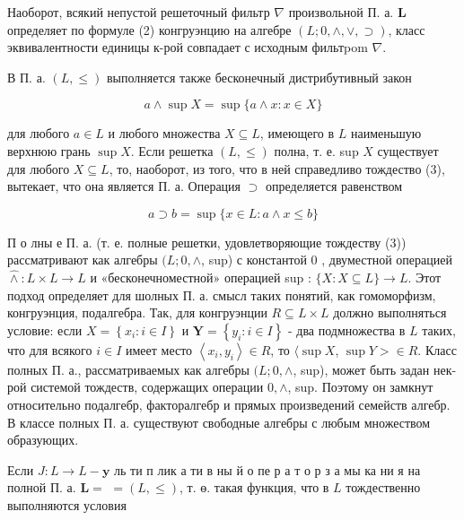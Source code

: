 \documentclass[10pt]{article}
\begin{document}
Наоборот, всякий непустой решеточный фильтр $\nabla$ произвольной П. а. $\boldsymbol{L}$ определяет по формуле (2) конгруэнцию на алгебре $(L ; 0, \wedge, \vee, \supset)$, класс эквивалентности единицы к-рой совпадает с исходным фильтpom $\nabla$.



В П. а. $(L, \leqslant)$ выполняется также бесконечный дистрибутивный закон



\[

a \wedge \sup X=\sup \{a \wedge x: x \in X\}

\]



для любого $a \in L$ и любого множества $X \subseteq L$, имеющего в $L$ наименьшую верхнюю грань $\sup X$. Если решетка $(L, \leqslant)$ полна, т. е. sup $X$ существует для любого $X \subseteq L$, то, наоборот, из того, что в ней справедливо тождество (3), вытекает, что она является П. а. Операция $\supset$ определяется равенством



\[

a \supset b=\sup \{x \in L: a \wedge x \leqslant b\}

\]



П о лны е П. а. (т. е. полные решетки, удовлетворяющие тождеству (3)) рассматривают как алгебры $(L ; 0, \wedge$, sup) с константой 0 , двуместной операцией $\widehat{\wedge}: L \times L \rightarrow L$ и «бесконечноместной» операцией sup : $\{X: X \subseteq L\} \rightarrow L$. Этот подход определяет для шолных П. а. смысл таких понятий, как гомоморфизм, конгруэнция, подалгебра. Так, для конгруэнции $R \subseteq L \times L$ должно выполняться условие: если $X=\left\{x_{i}: i \in I\right\}$ и $\boldsymbol{Y}=\left\{y_{i}: i \in I\right\}$ - два подмножества в $L$ таких, что для всякого $i \in I$ имеет место $\left\langle x_{i}, y_{i}\right\rangle \in R$, то $\langle\sup X$, $\sup Y>\in R$. Класс полных П. а., рассматриваемых как алгебры $(L ; 0, \wedge$, sup), может быть задан нек-рой системой тождеств, содержащих операции $0, \wedge$, sup. Поэтому он замкнут относительно подалгебр, факторалгебр и прямых произведений семейств алгебр. В классе полных П. а. существуют свободные алгебры с любым множеством образующих.



Если $J: L \rightarrow L-\mathbf{y}$ ль ти п лик а ти в ны й о пе р а т о р з а мы ка ни я на полной П. а. $\boldsymbol{L}=$ $=(L, \leqslant)$, т. ө. такая функция, что в $L$ тождественно выполняются условия
\end{document}
